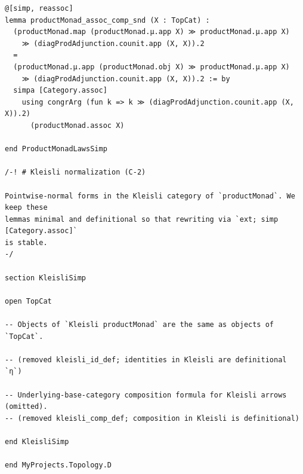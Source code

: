 \documentclass[12pt]{article}
\begin{document}
\begin{lstlisting}
@[simp, reassoc]
lemma productMonad_assoc_comp_snd (X : TopCat) :
  (productMonad.map (productMonad.μ.app X) ≫ productMonad.μ.app X)
    ≫ (diagProdAdjunction.counit.app (X, X)).2
  =
  (productMonad.μ.app (productMonad.obj X) ≫ productMonad.μ.app X)
    ≫ (diagProdAdjunction.counit.app (X, X)).2 := by
  simpa [Category.assoc]
    using congrArg (fun k => k ≫ (diagProdAdjunction.counit.app (X, X)).2)
      (productMonad.assoc X)

end ProductMonadLawsSimp

/-! # Kleisli normalization (C‑2)

Pointwise-normal forms in the Kleisli category of `productMonad`. We keep these
lemmas minimal and definitional so that rewriting via `ext; simp [Category.assoc]`
is stable.
-/

section KleisliSimp

open TopCat

-- Objects of `Kleisli productMonad` are the same as objects of `TopCat`.

-- (removed kleisli_id_def; identities in Kleisli are definitional `η`)

-- Underlying-base-category composition formula for Kleisli arrows (omitted).
-- (removed kleisli_comp_def; composition in Kleisli is definitional)

end KleisliSimp

end MyProjects.Topology.D

\end{lstlisting}
\end{document}
